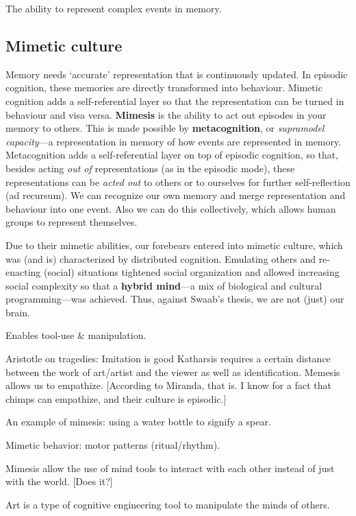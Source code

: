 \documentclass{article}
\begin{document}
The ability to represent complex events in memory.

\subsection{Mimetic culture}

Memory needs ‘accurate’ representation that is continuously updated. In episodic
cognition, these memories are directly transformed into behaviour. Mimetic
cognition adds a self-referential layer so that the representation can be
turned in behaviour and visa versa.  \textbf{Mimesis} is the ability to act out
episodes in your memory to others.  This is made possible by
\textbf{metacognition}, or \emph{supramodel capacity}---a representation in
memory of how events are represented in memory.  Metacognition adds a
self-referential layer on top of episodic cognition, so that, besides acting
\emph{out of} representations (as in the episodic mode), these representations
can be \emph{acted out} to others or to ourselves for further self-reflection
(ad recursum). We can recognize our own memory and merge representation and
behaviour into one event. Also we can do this collectively, which allows human
groups to represent themselves.

Due to their mimetic abilities, our forebears entered into mimetic culture,
which was (and is) characterized by distributed cognition. Emulating others
and re-enacting (social) situations tightened social organization and allowed
increasing social complexity so that a \textbf{hybrid mind}---a mix of
biological and cultural programming---was achieved. Thus, against Swaab's thesis,
we are not (just) our brain. 

Enables tool-use \& manipulation.

Aristotle on tragedies: Imitation is good
Katharsis requires a certain distance between the work of art/artist and the viewer as well as identification. Memesis allows us to empathize. [According to Miranda, that is. I know for a fact that chimps can empathize, and their culture is episodic.]

An example of mimesis: using a water bottle to signify a spear.

Mimetic behavior: motor patterns (ritual/rhythm).

Mimesis allow the use of mind tools to interact with each other instead of just with the world. [Does it?]

Art is a type of cognitive engineering tool to manipulate the minds of others.
\end{document}
